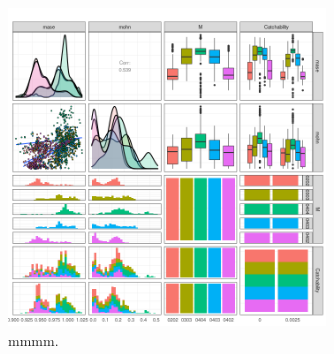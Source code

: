 \begin{figure}[ht!]\centering\includegraphics[width=0.75\textwidth]{figures/xxx-1.png} \caption{mmmm.}\label{fig:xxx} \end{figure}


